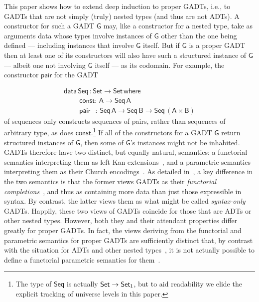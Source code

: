 \documentclass[9pt]{entcs}
\begin{document}
This paper shows how to extend deep induction to proper GADTs, i.e.,
to GADTs that are not simply (truly) nested types (and thus are not
ADTs).  A constructor for such a GADT $\mathsf{G}$ may, like a
constructor for a nested type, take as arguments data whose types
involve instances of $\mathsf{G}$ other than the one being defined ---
including instances that involve $\mathsf{G}$ itself. But if
$\mathsf{G}$ is a proper GADT then at least one of its constructors
will also have such a structured instance of $\mathsf{G}$ --- albeit
one not involving $\mathsf{G}$ itself --- as its codomain.
For example, the constructor $\mathsf{pair}$ for the GADT 

\vspace*{-0.1in}

\begin{equation}\label{eq:seq}
\begin{array}{l}
\mathsf{data\, Seq\,: Set \to Set\,where}\\
\mathsf{\;\;\;\;\;\;\;\;const :\, A \to Seq\,A}\\
\mathsf{\;\;\;\;\;\;\;\;pair\;\;\, :\, Seq \,A \to Seq\,B \to
  Seq\,(A \times B)}
\end{array}
\end{equation}
\noindent
of sequences only constructs sequences of pairs, rather than sequences
of arbitrary type, as does $\mathsf{const}$.\footnote{The type of
  $\mathsf{Seq}$ is actually $\mathsf{Set \to \mathsf{Set}_1}$, but to aid
  readability we elide the explicit tracking of universe levels in
  this paper.} If all of the constructors for a GADT $\mathsf{G}$
return structured instances of $\mathsf{G}$, then some of
$\mathsf{G}$'s instances might not be inhabited. GADTs therefore have
two distinct, but equally natural, semantics: a functorial semantics
interpreting them as left Kan extensions~\cite{mac71}, and a
parametric semantics interpreting them as their Church
encodings~\cite{atk12,vw10}. As detailed in~\cite{jgj21}, a key
difference in the two semantics is that the former views GADTs as
their {\em functorial completions}~\cite{jp19}, and thus as containing
more data than just those expressible in syntax. By contrast, the
latter views them as what might be called {\em syntax-only}
GADTs. Happily, these two views of GADTs coincide for those that are
ADTs or other nested types. However, both they and their attendant
properties differ greatly for proper GADTs. In fact, the views
deriving from the functorial and parametric semantics for proper GADTs
are sufficiently distinct that, by contrast with the situation for
ADTs and other nested types~\cite{bfss90,gjfor15,jgj21f}, it is not
actually possible to define a functorial parametric semantics for
them~\cite{jgj21}.
\end{document}
